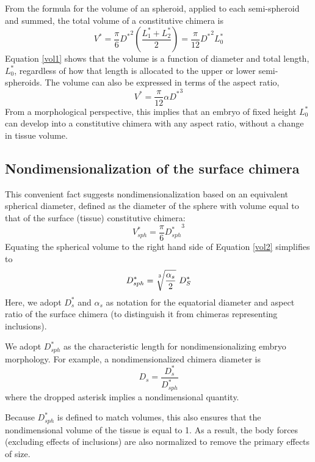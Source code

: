 \documentclass[10pt,a4paper]{article}
\begin{document}
From the formula for the volume of an spheroid, applied to each semi-spheroid and summed, the total volume of a constitutive chimera is
\begin{equation}\label{vol1}
	V^* = \frac{\pi}{6} {D^*}^2 \left(\frac{L_1^*+L_2^*}{2}\right) = \frac{\pi}{12} {D^*}^2 L_0^*
\end{equation} 
Equation \ref{vol1} shows that the volume is a function of diameter and total length, $L_0^*$, regardless of how that length is allocated to the upper or lower semi-spheroids.
The volume can also be expressed in terms of the aspect ratio,
\begin{equation}\label{vol2}
	V^* = \frac{\pi}{12} \alpha {D^*}^3
\end{equation} 
From a morphological perspective, this implies that an embryo of fixed height $L_0^*$ can develop into a constitutive chimera with any aspect ratio, without a change in tissue volume. 

\subsection{Nondimensionalization of the surface chimera}
This convenient fact suggests nondimensionalization based on an equivalent spherical diameter, defined as the diameter of the sphere with volume equal to that of the surface (tissue) constitutive chimera:
\begin{equation}\label{equivsphere}
	V_{sph}^* = \frac{\pi}{6} {D_{sph}^*}^3
\end{equation} 
Equating the spherical volume to the right hand side of Equation \ref{vol2} simplifies to
\begin{equation}\label{equivD}
	D_{sph}^* = \sqrt[\uproot{5}3]{\frac{\alpha_s}{2}} ~ D_S^*
\end{equation} 
Here, we adopt $D_s^*$ and $\alpha_s$ as notation for the equatorial diameter and aspect ratio of the surface chimera (to distinguish it from chimeras representing inclusions).

We adopt $D_{sph}^*$ as the characteristic length for nondimensionalizing embryo morphology.
For example, a nondimensionalized chimera diameter is
\begin{equation}\label{ndD}
	D_s = \frac{D_s^*}{D_{sph}^*}
\end{equation} 
where the dropped asterisk implies a nondimensional quantity.

Because $D_{sph}^*$ is defined to match volumes, this also ensures that the nondimensional volume of the tissue is equal to 1.
As a result, the body forces (excluding effects of inclusions) are also normalized to remove the primary effects of size.
\end{document}
